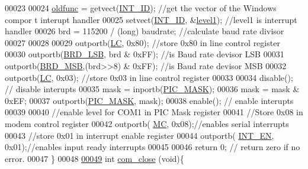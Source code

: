 \begin{DoxyCode}
00023           
00024                 \hyperlink{_m_p_x___r5_8h_aecebfaddee878c55ece8a1aa8ac843d4}{oldfunc} = getvect(\hyperlink{_m_p_x___r5_8h_a57912ff27e6b123b86821203a0338760}{INT_ID}); \textcolor{comment}{//get the vector of the Windows compor
      t interupt handler  }
00025                 setvect(\hyperlink{_m_p_x___r5_8h_a57912ff27e6b123b86821203a0338760}{INT_ID}, &\hyperlink{_m_p_x___r5_8_c_a49235bff2654267b70d5656543f2ba81}{level1}); \textcolor{comment}{//level1 is interrupt handler      }
00026                 brd = 115200 / (long) baudrate; \textcolor{comment}{//calculate baud rate divisor}
00027          
00028                 
00029                 outportb(\hyperlink{_m_p_x___r5_8h_aa499bb75bb504909cd0a72baf48c4653}{LC}, 0x80); \textcolor{comment}{//store 0x80 in line control register }
00030                 outportb(\hyperlink{_m_p_x___r5_8h_a4c32fec003a7f9e7fefc8b8b1f237dd8}{BRD_LSB}, brd & 0xFF); \textcolor{comment}{//is Baud rate devisor LSB       }
00031                 outportb(\hyperlink{_m_p_x___r5_8h_aa071df7caa6499a431c734cc5adde587}{BRD_MSB},(brd>>8) & 0xFF); \textcolor{comment}{//is Baud rate devisor MSB   }
00032                 outportb(\hyperlink{_m_p_x___r5_8h_aa499bb75bb504909cd0a72baf48c4653}{LC}, 0x03); \textcolor{comment}{//store 0x03 in line control register }
00033         
00034                 disable(); \textcolor{comment}{// disable interupts }
00035                 mask = inportb(\hyperlink{_m_p_x___r5_8h_a89831dd7cb646bfa61461e0b1d91add7}{PIC_MASK}); 
00036                 mask = mask & 0xEF; 
00037                 outportb(\hyperlink{_m_p_x___r5_8h_a89831dd7cb646bfa61461e0b1d91add7}{PIC_MASK}, mask); 
00038                 enable(); \textcolor{comment}{// enable interupts}
00039          
00040                 \textcolor{comment}{//enable level for COM1 in PIC Mask register }
00041                 \textcolor{comment}{//Store 0x08 in modem control register }
00042                 outportb( \hyperlink{_m_p_x___r5_8h_a71d9e511e7e302cd831e83581219e70d}{MC}, 0x08);\textcolor{comment}{//enables serial interrupts }
00043                 \textcolor{comment}{//store 0x01 in interrupt enable register }
00044                 outportb( \hyperlink{_m_p_x___r5_8h_a8dc8a6ba32861f0a3cbd89fa1ec0d216}{INT_EN}, 0x01);\textcolor{comment}{//enables input ready interrupts }
00045          
00046     \textcolor{keywordflow}{return} 0; \textcolor{comment}{// return zero if no error.}
00047         \}
00048         
\hypertarget{_m_p_x___r5_8_c_source_l00049}{}\hyperlink{_m_p_x___r5_8h_aa39f1d25e881ffac9559b2fe816fe943}{00049}         \textcolor{keywordtype}{int} \hyperlink{_m_p_x___r5_8_c_aa39f1d25e881ffac9559b2fe816fe943}{com_close} (\textcolor{keywordtype}{void})\{

\end{DoxyCode}
